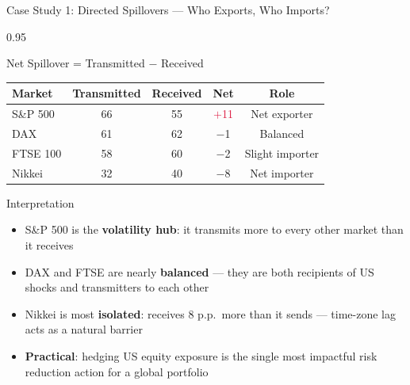 \documentclass[9pt, aspectratio=169, t]{beamer}
\begin{document}
\begin{frame}{Case Study 1: Directed Spillovers --- Who Exports, Who Imports?}
    \begin{cminipage}{0.95\textwidth}
    {\footnotesize
    \begin{block}{Net Spillover = Transmitted $-$ Received}
        \vspace{0.1cm}
        {\small
        \begin{center}
        \begin{tabular}{l|ccc|c}
            \hline
            \textbf{Market} & \textbf{Transmitted} & \textbf{Received} & \textbf{Net} & \textbf{Role} \\
            \hline
            S\&P 500  & 66 & 55 & \textcolor{Crimson}{$+$11} & Net exporter \\
            DAX       & 61 & 62 & \textcolor{MainBlue}{$-$1} & Balanced \\
            FTSE 100  & 58 & 60 & \textcolor{MainBlue}{$-$2} & Slight importer \\
            Nikkei    & 32 & 40 & \textcolor{MainBlue}{$-$8} & Net importer \\
            \hline
        \end{tabular}
        \end{center}
        }
    \end{block}
    \begin{alertblock}{Interpretation}
        \begin{itemize}\setlength{\itemsep}{0pt}
            \item S\&P 500 is the \textbf{volatility hub}: it transmits more to every other market than it receives
            \item DAX and FTSE are nearly \textbf{balanced} --- they are both recipients of US shocks and transmitters to each other
            \item Nikkei is most \textbf{isolated}: receives 8 p.p.\ more than it sends --- time-zone lag acts as a natural barrier
            \item \textbf{Practical}: hedging US equity exposure is the single most impactful risk reduction action for a global portfolio
        \end{itemize}
    \end{alertblock}
    }
    \end{cminipage}
\end{frame}
\end{document}
